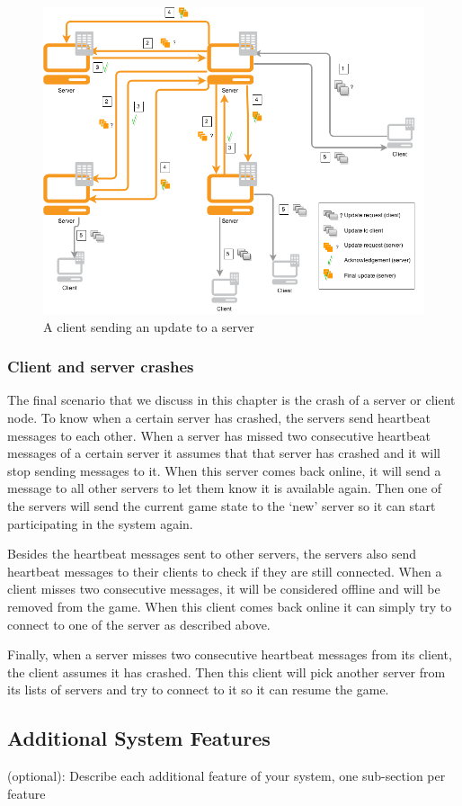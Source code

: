 \begin{figure}[h!]
  \centering
    \includegraphics[width=\textwidth]{diagrams/game-update}
    
  \caption{A client sending an update to a server}
  \label{update_diagram}
\end{figure}

\subsubsection*{Client and server crashes}
The final scenario that we discuss in this chapter is the crash of a server or client node. To know when a certain server has crashed, the servers send heartbeat messages to each other. When a server has missed two consecutive heartbeat messages of a certain server it assumes that that server has crashed and it will stop sending messages to it. When this server comes back online, it will send a message to all other servers to let them know it is available again. Then one of the servers will send the current game state to the `new' server so it can start participating in the system again. 

Besides the heartbeat messages sent to other servers, the servers also send heartbeat messages to their clients to check if they are still connected. When a client misses two consecutive messages, it will be considered offline and will be removed from the game. When this client comes back online it can simply try to connect to one of the server as described above.

Finally, when a server misses two consecutive heartbeat messages from its client, the client assumes it has crashed. Then this client will pick another server from its lists of servers and try to connect to it so it can resume the game.

\subsection{Additional System Features}
(optional): Describe each additional feature of your system, one sub-section per feature
 